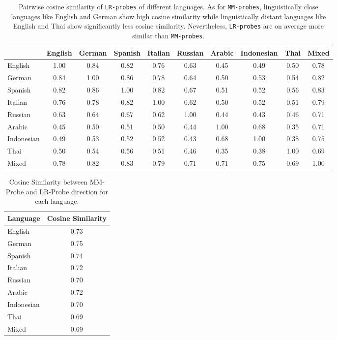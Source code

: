 \begin{table}[h]
\centering
\footnotesize
\setlength{\tabcolsep}{4pt}
\begin{tabular}{lccccccccc}
\toprule
 & English & German & Spanish & Italian & Russian & Arabic & Indonesian & Thai & Mixed \\
\midrule
English & 1.00 & 0.84 & 0.82 & 0.76 & 0.63 & 0.45 & 0.49 & 0.50 & 0.78 \\
German & 0.84 & 1.00 & 0.86 & 0.78 & 0.64 & 0.50 & 0.53 & 0.54 & 0.82 \\
Spanish & 0.82 & 0.86 & 1.00 & 0.82 & 0.67 & 0.51 & 0.52 & 0.56 & 0.83 \\
Italian & 0.76 & 0.78 & 0.82 & 1.00 & 0.62 & 0.50 & 0.52 & 0.51 & 0.79 \\
Russian & 0.63 & 0.64 & 0.67 & 0.62 & 1.00 & 0.44 & 0.43 & 0.46 & 0.71 \\
Arabic & 0.45 & 0.50 & 0.51 & 0.50 & 0.44 & 1.00 & 0.68 & 0.35 & 0.71 \\
Indonesian & 0.49 & 0.53 & 0.52 & 0.52 & 0.43 & 0.68 & 1.00 & 0.38 & 0.75 \\
Thai & 0.50 & 0.54 & 0.56 & 0.51 & 0.46 & 0.35 & 0.38 & 1.00 & 0.69 \\
Mixed & 0.78 & 0.82 & 0.83 & 0.79 & 0.71 & 0.71 & 0.75 & 0.69 & 1.00 \\
\bottomrule
\end{tabular}
\caption{Pairwise cosine similarity of \texttt{LR-probes} of different languages. As for \texttt{MM-probes}, linguistically close languages like English and German show high cosine similarity while linguistically distant languages like English and Thai show significantly less cosine similarity. Nevertheless, \texttt{LR-probes} are on average more similar than \texttt{MM-probes}.}
\label{tab:lr_cosim}
\end{table}

\begin{table}[h]
    \centering
    \begin{tabular}{lc}
    \toprule
    Language & Cosine Similarity\\
    \midrule
       English  &  0.73\\
         German & 0.75\\
         Spanish & 0.74\\
         Italian & 0.72\\
         Russian & 0.70\\
         Arabic & 0.72\\
         Indonesian & 0.70\\
         Thai & 0.69\\
         Mixed & 0.69\\
         \bottomrule
    \end{tabular}
    \caption{Cosine Similarity between MM-Probe and LR-Probe direction for each language.}
    \label{tab:mm_lr_cosim}
\end{table}

